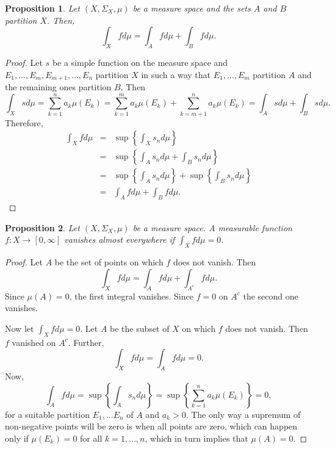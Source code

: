 \documentclass{article}
\theoremstyle{plain}
\numberwithin{thm}{section}
\theoremstyle{plain}
\newtheorem{prop}{Proposition}
\numberwithin{prop}{section}
\theoremstyle{definition}
\numberwithin{defn}{section}
\theoremstyle{remark}
\theoremstyle{plain}
\numberwithin{cor}{section}
\numberwithin{equation}{section}
\begin{document}
\begin{prop}\label{s3p13}
Let $(X, \Sigma_X, \mu)$ be a measure space and the sets $A$ and $B$ partition
$X$. Then,
\[
\int_X fd\mu = \int_A f d\mu + \int_B fd\mu.
\]
\end{prop}
\begin{proof}
Let $s$ be a simple function on the measure space and $E_1, \ldots, E_m, E_{m+1},
\ldots, E_n$ partition $X$ in such a way that $E_1, \ldots, E_m$ partition $A$
and the remaining ones partition $B$. Then
\[
\int_X sd\mu = \sum_{k=1}^n a_k \mu(E_k) = \sum_{k=1}^m a_k \mu(E_k) + 
\sum_{k=m+1}^n a_k\mu(E_k) = \int_A sd\mu + \int_B sd\mu.
\]
Therefore,
\begin{eqnarray*}
\int_X fd\mu &=& \sup\left\{\int_X s_n d\mu\right\} \\
 &=& \sup\left\{\int_A s_n d\mu + \int_B s_n d\mu\right\} \\
 &=& \sup\left\{\int_A s_n d\mu\right\} + \sup\left\{\int_B s_n d\mu\right\} \\
 &=& \int_A fd\mu + \int_B fd\mu.
\end{eqnarray*} 
\end{proof}

\begin{prop}\label{s3p14}
Let $(X, \Sigma_X, \mu)$ be a measure space. A measurable function $f:X 
\rightarrow [0, \infty]$ vanishes almost everywhere if $\int_X fd\mu = 0$.
\end{prop}
\begin{proof}
Let $A$ be the set of points on which $f$ does not vanish. Then
\[
\int_X f d\mu = \int_A fd\mu + \int_{A^c}fd\mu.
\]
Since $\mu(A) = 0$, the first integral vanishes. Since $f = 0$ on $A^c$ the
second one vanishes.

Now let $\int_X f d\mu = 0$. Let $A$ be the subset of $X$ on which $f$ does
not vanish. Then $f$ vanished on $A^c$. Further,
\[
\int_X fd\mu = \int_A fd\mu = 0.
\]
Now,
\[
\int_A fd\mu = \sup\left\{\int_A s_n d\mu\right\} =
\sup\left\{\sum_{k=1}^n a_k\mu(E_k)\right\} = 0,
\]
for a suitable partition $E_1, \ldots E_n$ of $A$ and $a_k > 0$. The only way
a supremum of non-negative points will be zero is when all points are zero,
which can happen only if $\mu(E_k) = 0$ for all $k = 1, \ldots, n$, which in
turn implies that $\mu(A) = 0$.
\end{proof}
\end{document}
